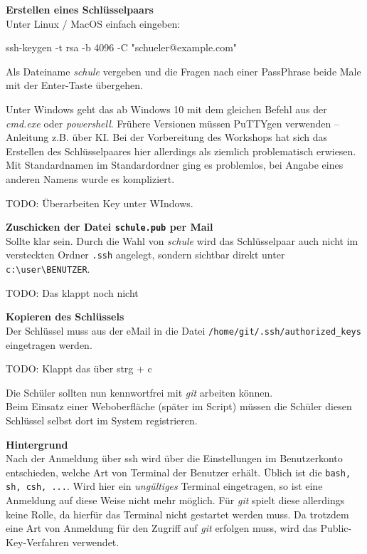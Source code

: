 \documentclass[
  letterpaper,
  DIV=11]{scrreprt}
\newenvironment{Shaded}{\begin{snugshade}}{\end{snugshade}}
\newcommand{\AttributeTok}[1]{\textcolor[rgb]{0.40,0.45,0.13}{#1}}
\newcommand{\FunctionTok}[1]{\textcolor[rgb]{0.28,0.35,0.67}{#1}}
\newcommand{\NormalTok}[1]{\textcolor[rgb]{0.00,0.23,0.31}{#1}}
\newcommand{\StringTok}[1]{\textcolor[rgb]{0.13,0.47,0.30}{#1}}
\newcommand{\git}{\textit{git}\xspace}
\newcommand{\strg}[1]{strg + #1\xspace}
\begin{document}
\textbf{Erstellen eines Schlüsselpaars}\\
Unter Linux / MacOS einfach eingeben:

\begin{Shaded}
\begin{Highlighting}[]
\FunctionTok{ssh{-}keygen} \AttributeTok{{-}t}\NormalTok{ rsa }\AttributeTok{{-}b}\NormalTok{ 4096 }\AttributeTok{{-}C} \StringTok{"schueler@example.com"}
\end{Highlighting}
\end{Shaded}

Als Dateiname \emph{schule} vergeben und die Fragen nach einer
PassPhrase beide Male mit der Enter-Taste übergehen.

Unter Windows geht das ab Windows 10 mit dem gleichen Befehl aus der
\emph{cmd.exe} oder \emph{powershell}. Frühere Versionen müssen PuTTYgen
verwenden -- Anleitung z.B. über KI. Bei der Vorbereitung des Workshops
hat sich das Erstellen des Schlüsselpaares hier allerdings als ziemlich
problematisch erwiesen. Mit Standardnamen im Standardordner ging es
problemlos, bei Angabe eines anderen Namens wurde es kompliziert.

TODO: Überarbeiten Key unter WIndows.

\textbf{Zuschicken der Datei \texttt{schule.pub} per Mail}\\
Sollte klar sein. Durch die Wahl von \emph{schule} wird das
Schlüsselpaar auch nicht im versteckten Ordner \texttt{.ssh} angelegt,
sondern sichtbar direkt unter
\texttt{c:\textbackslash{}user\textbackslash{}BENUTZER}.

TODO: Das klappt noch nicht

\textbf{Kopieren des Schlüssels}\\
Der Schlüssel muss aus der eMail in die Datei
\texttt{/home/git/.ssh/authorized\_keys} eingetragen werden.

TODO: Klappt das über \strg{c}

Die Schüler sollten nun kennwortfrei mit \git arbeiten können.\\
Beim Einsatz einer Weboberfläche (später im Script) müssen die Schüler
diesen Schlüssel selbst dort im System registrieren.

\samplestart

\textbf{Hintergrund}\\
Nach der Anmeldung über ssh wird über die Einstellungen im Benutzerkonto
entschieden, welche Art von Terminal der Benutzer erhält. Üblich ist die
\verb+bash, sh, csh, ...+. Wird hier ein \textit{ungültiges} Terminal
eingetragen, so ist eine Anmeldung auf diese Weise nicht mehr möglich.
Für \git  spielt diese allerdings keine Rolle, da hierfür das Terminal
nicht gestartet werden muss. Da trotzdem eine Art von Anmeldung für den
Zugriff auf \git  erfolgen muss, wird das Public-Key-Verfahren
verwendet.
\end{document}
